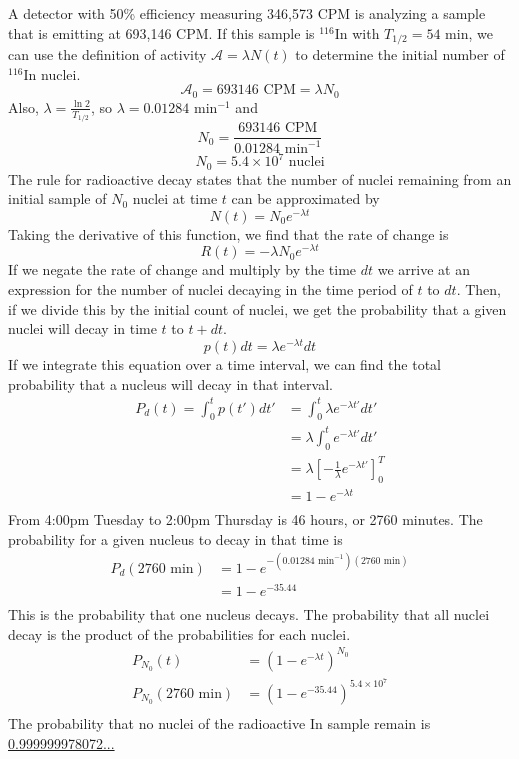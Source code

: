 \documentclass{article}
\begin{document}
A detector with 50\% efficiency measuring 346,573 CPM is analyzing a sample that is emitting at 693,146 CPM. If this sample is $^{116}$In with $T_{1/2} = 54$ min, we can use the definition of activity $\mathcal{A} = \lambda N(t)$ to determine the initial number of $^{116}$In nuclei. 
$$ \mathcal{A_0} = 693146 \text{ CPM} = \lambda N_0 $$
Also, $\lambda = \frac{\ln 2}{T_{1/2}}$, so $\lambda = 0.01284$ min$^{-1}$ and
$$ N_0 = \frac{693146\text{ CPM}}{0.01284\text{ min}^{-1}} $$
$$ N_0 = 5.4 \times 10^7 \text{ nuclei} $$
The rule for radioactive decay states that the number of nuclei remaining from an initial sample of $N_0$ nuclei at time $t$ can be approximated by
$$ N(t) = N_0 e^{-\lambda t} $$
Taking the derivative of this function, we find that the rate of change is 
$$ R(t) = -\lambda N_0 e^{-\lambda t} $$
If we negate the rate of change and multiply by the time $dt$ we arrive at an expression for the number of nuclei decaying in the time period of $t$ to $dt$. Then, if we divide this by the initial count of nuclei, we get the probability that a given nuclei will decay in time $t$ to $t+dt$. 
$$ p(t)dt = \lambda e^{-\lambda t} dt $$
If we integrate this equation over a time interval, we can find the total probability that a nucleus will decay in that interval.
\begin{align*}
P_d(t) = \int_0^t p(t')dt'	&= \int_0^t \lambda e^{-\lambda t'} dt'\\
							&= \lambda \int_0^t e^{-\lambda t'} dt'\\
							&= \lambda \left[ -\frac{1}{\lambda} e^{-\lambda t'} \right]_0^T\\
							&= 1 - e^{-\lambda t} \\
\end{align*}
From 4:00pm Tuesday to 2:00pm Thursday is 46 hours, or 2760 minutes. The probability for a given nucleus to decay in that time is
\begin{align*}
P_d(2760\text{ min})	&= 1-e^{-(0.01284 \text{ min}^{-1})(2760\text{ min})} \\ 
					&= 1-e^{-35.44} \\
\end{align*}
This is the probability that one nucleus decays. The probability that all nuclei decay is the product of the probabilities for each nuclei.
\begin{align*} 
P_{N_0}(t)					&= (1 - e^{-\lambda t})^{N_0} \\
P_{N_0}(2760\text{ min})	&= (1- e^{-35.44})^{5.4\times10^7} \\
\end {align*}
The probability that no nuclei of the radioactive In sample remain is \underline{0.999999978072...}
\end{document}
